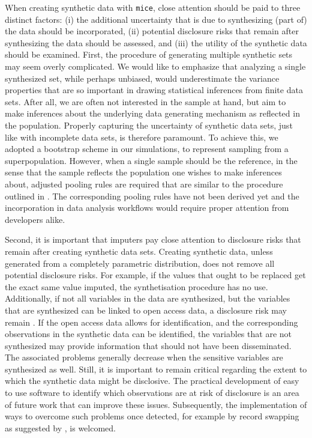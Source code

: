 \documentclass[psych,article,submit,moreauthors,pdftex]{mdpi}
\begin{document}
When creating synthetic data with \texttt{mice}, close attention should
be paid to three distinct factors: (i) the additional uncertainty that
is due to synthesizing (part of) the data should be incorporated, (ii)
potential disclosure risks that remain after synthesizing the data
should be assessed, and (iii) the utility of the synthetic data should
be examined. First, the procedure of generating multiple synthetic sets
may seem overly complicated. We would like to emphasize that analyzing a
single synthesized set, while perhaps unbiased, would underestimate the
variance properties that are so important in drawing statistical
inferences from finite data sets. After all, we are often not interested
in the sample at hand, but aim to make inferences about the underlying
data generating mechanism as reflected in the population. Properly
capturing the uncertainty of synthetic data sets, just like with
incomplete data sets, is therefore paramount. To achieve this, we
adopted a bootstrap scheme in our simulations, to represent sampling
from a superpopulation. However, when a single sample should be the
reference, in the sense that the sample reflects the population one
wishes to make inferences about, adjusted pooling rules are required
that are similar to the procedure outlined in \citet{vink2014pooling}.
The corresponding pooling rules have not been derived yet and the
incorporation in data analysis workflows would require proper attention
from developers alike.

Second, it is important that imputers pay close attention to disclosure
risks that remain after creating synthetic data sets. Creating synthetic
data, unless generated from a completely parametric distribution, does
not remove all potential disclosure risks. For example, if the values
that ought to be replaced get the exact same value imputed, the
synthetisation procedure has no use. Additionally, if not all variables
in the data are synthesized, but the variables that are synthesized can
be linked to open access data, a disclosure risk may remain
\citep{drechsler2011empirical}. If the open access data allows for
identification, and the corresponding observations in the synthetic data
can be identified, the variables that are not synthesized may provide
information that should not have been disseminated. The associated
problems generally decrease when the sensitive variables are synthesized
as well. Still, it is important to remain critical regarding the extent
to which the synthetic data might be disclosive. The practical
development of easy to use software to identify which observations are
at risk of disclosure is an area of future work that can improve these
issues. Subsequently, the implementation of ways to overcome such
problems once detected, for example by record swapping as suggested by
\citet{jiang2021balancing}, is welcomed.
\end{document}
